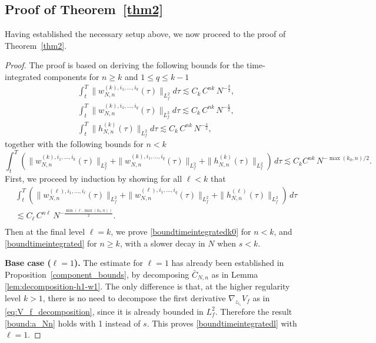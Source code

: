 \documentclass[pdflatex,sn-mathphys-num]{sn-jnl}
\theoremstyle{thmstyleone}%
\theoremstyle{thmstyletwo}%
\theoremstyle{thmstylethree}%
\begin{document}
\subsection{Proof of Theorem~\ref{thm2} }
Having established the necessary setup above, we now proceed to the proof of Theorem~\ref{thm2}.
\begin{proof}
The proof is based on deriving the following bounds for the time-integrated components for \(n\ge k\) and \(1\le q\le k-1\) 
\begin{equation}\label{boundtimeintegrated}
\begin{split}
&\int_t^T \|w^{(k),i_1,...,i_k}_{N,n} (\tau)\|_{L^2_f}d\tau \lesssim {C}_k\, C^{nk}\, N^{-\frac{k}{2}},\\ 
&\int_t^T \|w^{(k),i_1,...,i_q}_{N,n}(\tau) \|_{L^2_f}d\tau \lesssim {C}_k\,C^{nk}\, N^{-\frac{k}{2}}, \\
&\int_t^T \|h^{(k)}_{N,n}(\tau) \|_{L^2_f}d\tau \lesssim {C}_k\,C^{nk}\, N^{-\frac{s}{2}},
\end{split}
\end{equation}
together with the following bounds for \(n<k\) 
\begin{equation}
 \int_t^T \left(\|w_{N,n}^{(k),i_1,...,i_k}(\tau) \|_{L^2_f}+  \|w_{N,n}^{(k),i_1,...,i_q}(\tau) \|_{L^2_f}+\|h_{N,n}^{(k)}(\tau) \|_{L^2_f}\right)\,d\tau\lesssim  C_k C^{nk}\,N^{-\max(k_0,n)/2}.\label{boundtimeintegratedk0}
\end{equation}
First, we proceed by induction by showing for all $\ell<k$ that
\begin{equation}\label{boundtimeintegratedl}
\begin{split}
&\int_t^T \left(\|w^{(\ell),i_1,...,i_\ell}_{N,n} (\tau)\|_{L^2_f}+ \|w^{(\ell),i_1,...,i_q}_{N,n}(\tau) \|_{L^2_f}+\|h^{(\ell)}_{N,n}(\tau) \|_{L^2_f}\right)\,d\tau \\& \lesssim {C}_\ell\, C^{n\ell}\, N^{-\frac{\min(\ell,\max(k_0,n))}{2}}.\\ 
\end{split}
\end{equation}
Then at the final level \(\ell=k\), we prove \eqref{boundtimeintegratedk0} for $n<k$, and \eqref{boundtimeintegrated} for $n \geq k$, with a slower decay in \(N\) when \(s<k\).

\medskip

\noindent\textbf{Base case (\(\ell=1\)).} The estimate for \(\ell=1\) has already been established 
in Proposition~\ref{component_bounds}, by decomposing $\bar{C}_{N,n}$ as in Lemma \ref{lem:decomposition-h1-w1}. The only difference is that, at the higher regularity level \(k>1\), there is no need to decompose the first derivative \(\nabla_{z_{i_1}}V_f\) as in \eqref{eq:V_f_decomposition}, since it is already bounded in $L^2_f$. Therefore the result \eqref{bound:a_Nn} holds with 1 instead of $s$. This proves \eqref{boundtimeintegratedl} with $\ell=1$.


\end{proof}
\end{document}

